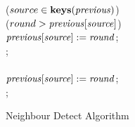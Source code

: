 \begin{figure}[H]
\begin{boxedminipage}{\linewidth}
    \null\qq\qq {} ($source \in \mbox{\textbf{keys}}(\mbox{\emph{previous}})$)  \\
    \null\qq\qq\qq {} ($round > \mbox{\emph{previous}}[\mbox{\emph{source}}]$)  \\
    \null\qq\qq\qq\qq $\mbox{\emph{previous}}[\mbox{\emph{source}}] \mathrel{:=} \mbox{\emph{round}}$; \\
    \null\qq\qq\qq {}; \\
    \null\qq\qq {} \\
    \null\qq\qq\qq $\mbox{\emph{previous}}[\mbox{\emph{source}}] \mathrel{:=} \mbox{\emph{round}}$; \\
    \null\qq\qq {}; \\
  \end{boxedminipage}
  \caption{Neighbour Detect Algorithm}
  \label{algo:neighbour-detect}
\end{figure}

